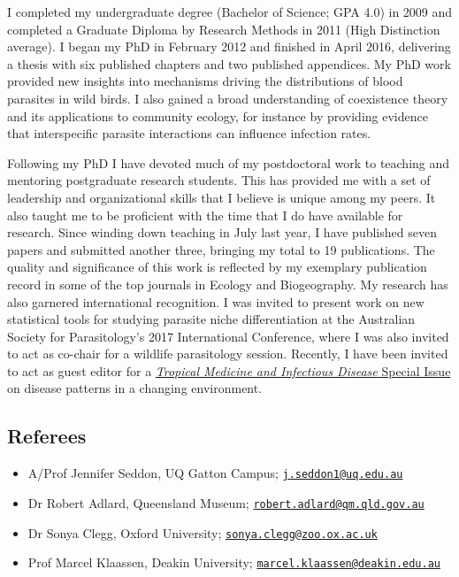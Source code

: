 \documentclass[]{article}
\providecommand{\tightlist}{%
  \setlength{\itemsep}{0pt}\setlength{\parskip}{0pt}}
\begin{document}
I completed my undergraduate degree (Bachelor of Science; GPA 4.0) in
2009 and completed a Graduate Diploma by Research Methods in 2011 (High
Distinction average). I began my PhD in February 2012 and finished in
April 2016, delivering a thesis with six published chapters and two
published appendices. My PhD work provided new insights into mechanisms
driving the distributions of blood parasites in wild birds. I also
gained a broad understanding of coexistence theory and its applications
to community ecology, for instance by providing evidence that
interspecific parasite interactions can influence infection rates.

Following my PhD I have devoted much of my postdoctoral work to teaching
and mentoring postgraduate research students. This has provided me with
a set of leadership and organizational skills that I believe is unique
among my peers. It also taught me to be proficient with the time that I
do have available for research. Since winding down teaching in July last
year, I have published seven papers and submitted another three,
bringing my total to 19 publications. The quality and significance of
this work is reflected by my exemplary publication record in some of the
top journals in Ecology and Biogeography. My research has also garnered
international recognition. I was invited to present work on new
statistical tools for studying parasite niche differentiation at the
Australian Society for Parasitology's 2017 International Conference,
where I was also invited to act as co-chair for a wildlife parasitology
session. Recently, I have been invited to act as guest editor for a
\href{http://www.mdpi.com/journal/tropicalmed/special_issues/Medical_Geography}{\emph{Tropical
Medicine and Infectious Disease} Special Issue} on disease patterns in a
changing environment.

\subsection{Referees}\label{referees}

\begin{itemize}
\tightlist
\item
  A/Prof Jennifer Seddon, UQ Gatton Campus;
  \href{mailto:j.seddon1@uq.edu.au}{\nolinkurl{j.seddon1@uq.edu.au}}
\item
  Dr Robert Adlard, Queensland Museum;
  \href{mailto:robert.adlard@qm.qld.gov.au}{\nolinkurl{robert.adlard@qm.qld.gov.au}}
\item
  Dr Sonya Clegg, Oxford University;
  \href{mailto:sonya.clegg@zoo.ox.ac.uk}{\nolinkurl{sonya.clegg@zoo.ox.ac.uk}}
\item
  Prof Marcel Klaassen, Deakin University;
  \href{mailto:marcel.klaassen@deakin.edu.au}{\nolinkurl{marcel.klaassen@deakin.edu.au}}
\end{itemize}
\end{document}
